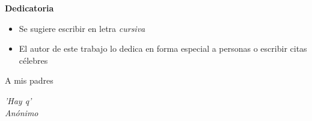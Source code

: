\begin{center}
\textbf{Dedicatoria}
\end{center}

\begin{itemize}[label=] %
    \item Se sugiere escribir en letra \textit{cursiva}
    \item El autor de este trabajo lo dedica en forma especial a personas o escribir citas célebres
\end{itemize}

\vspace{10pt}

\begin{flushright}
A mis padres
\end{flushright}

\begin{flushright}
\textit{'Hay q'} \\
\textit{Anónimo}
\end{flushright}

